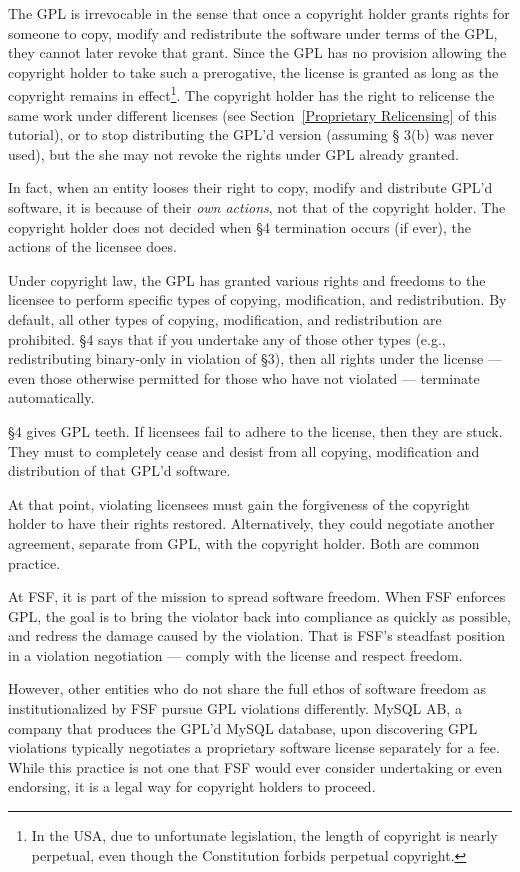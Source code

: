 \documentclass[12pt]{report}
\begin{document}
The GPL is irrevocable in the sense that once a copyright holder grants
rights for someone to copy, modify and redistribute the software under
terms of the GPL, they cannot later revoke that grant.  Since the GPL has
no provision allowing the copyright holder to take such a prerogative, the
license is granted as long as the copyright remains in effect\footnote{In
  the USA, due to unfortunate legislation, the length of copyright is
  nearly perpetual, even though the Constitution forbids perpetual
  copyright.}.  The copyright holder has the right to relicense the same
work under different licenses (see Section~\ref{Proprietary Relicensing}
of this tutorial), or to stop distributing the GPL'd version (assuming \S
3(b) was never used), but the she may not revoke the rights under GPL
already granted.

In fact, when an entity looses their right to copy, modify and distribute
GPL'd software, it is because of their \emph{own actions}, not that of
the copyright holder.  The copyright holder does not decided when \S 4
termination occurs (if ever), the actions of the licensee does.

Under copyright law, the GPL has granted various rights and freedoms to
the licensee to perform specific types of copying, modification, and
redistribution.  By default, all other types of copying, modification, and
redistribution are prohibited.  \S 4 says that if you undertake any of
those other types (e.g., redistributing binary-only in violation of \S 3),
then all rights under the license --- even those otherwise permitted for
those who have not violated --- terminate automatically.

\S 4 gives GPL teeth.  If licensees fail to adhere to the license, then
they are stuck.  They must to completely cease and desist from all
copying, modification and distribution of that GPL'd software.

At that point, violating licensees must gain the forgiveness of the
copyright holder to have their rights restored.  Alternatively, they could
negotiate another agreement, separate from GPL, with the copyright
holder.  Both are common practice.

At FSF, it is part of the mission to spread software freedom.  When FSF
enforces GPL, the goal is to bring the violator back into compliance as
quickly as possible, and redress the damage caused by the violation.
That is FSF's steadfast position in a violation negotiation --- comply
with the license and respect freedom.

However, other entities who do not share the full ethos of software
freedom as institutionalized by FSF pursue GPL violations differently.  MySQL
AB, a company that produces the GPL'd MySQL database, upon discovering
GPL violations typically negotiates a proprietary software license
separately for a fee.  While this practice is not one that FSF would ever
consider undertaking or even endorsing, it is a legal way for copyright
holders to proceed.
\end{document}
